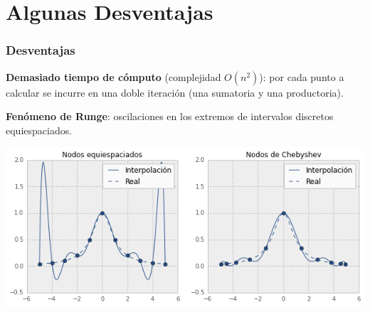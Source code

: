 \documentclass[11pt,xcolor={rgb}]{beamer}
\begin{document}
%
%
%
%

\section{Algunas Desventajas}

\begin{frame}[fragile=singleslide]
\frametitle{Desventajas}

\textbf{Demasiado tiempo de c\'omputo} (complejidad $O(n^2)$): por cada punto a calcular se incurre en una doble iteraci\'on (una sumatoria y una productoria).

\textbf{Fen\'omeno de Runge}: oscilaciones en los extremos de intervalos discretos equiespaciados.

\begin{center}
	\includegraphics[scale=0.5]{runge1}
\end{center}


\end{frame}

%
\end{document}
